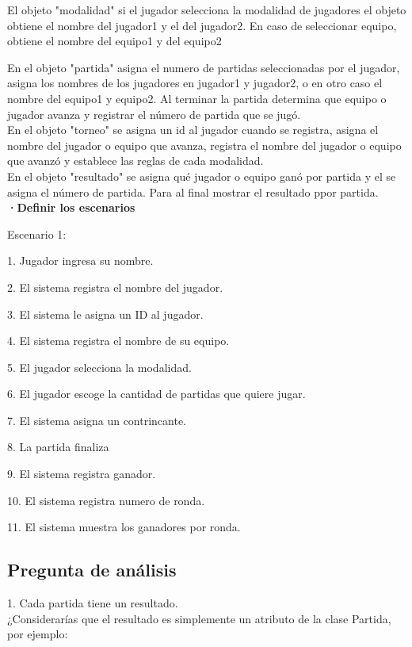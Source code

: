 \documentclass[12pt]{article}
\begin{document}
El objeto "modalidad" si el jugador selecciona la modalidad de jugadores el objeto obtiene el nombre del jugador1 y el del jugador2. En caso de seleccionar equipo, obtiene el nombre del equipo1 y del equipo2

En el objeto "partida" asigna el numero de partidas seleccionadas por el jugador, asigna los nombres de los jugadores en jugador1 y jugador2, o en otro caso el nombre del equipo1 y equipo2. Al terminar la partida determina que equipo o jugador avanza y registrar el número de partida que se jugó. \\

En el objeto "torneo" se asigna un id al jugador cuando se registra, asigna el nombre del jugador o equipo que avanza, registra el nombre del jugador o equipo que avanzó y establece las reglas de cada modalidad. \\

En el objeto "resultado" se asigna qué jugador o equipo ganó por partida y el se asigna el número de partida. Para al final mostrar el resultado ppor partida. \\

\textbf{·Definir los escenarios}

Escenario 1:

1. Jugador ingresa su nombre.

2. El sistema registra el nombre del jugador.

3. El sistema le asigna un ID al jugador.

4. El sistema registra el nombre de su equipo.

5. El jugador selecciona la modalidad.

6. El jugador escoge la cantidad de partidas que quiere jugar.

7. El sistema asigna un contrincante.

8. La partida finaliza

9. El sistema registra ganador.

10. El sistema registra numero de ronda.

11. El sistema muestra los ganadores por ronda.


\subsection*{Pregunta de análisis}

1. Cada partida tiene un resultado. \\

¿Considerarías que el resultado es simplemente un atributo de la clase Partida,
por ejemplo:\\
\end{document}
